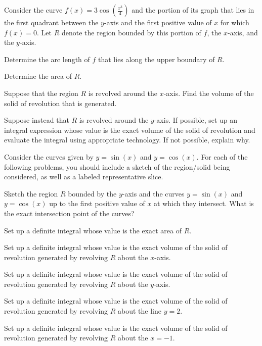 \begin{exercises} 

  \item Consider the curve $f(x) = 3 \cos(\frac{x^3}{4})$ and the portion of its graph that lies in the first quadrant between the $y$-axis and the first positive value of $x$ for which $f(x) = 0$.  Let  $R$ denote the region bounded by this portion of $f$, the $x$-axis, and the $y$-axis.  
   \ba
   		\item Determine the arc length of $f$ that lies along the upper boundary of $R$. 	
		\item Determine the area of $R$.
		\item Suppose that the region $R$ is revolved around the $x$-axis.  Find the volume of the solid of revolution that is generated.  
		\item Suppose instead that $R$ is revolved around the $y$-axis.  If possible, set up an integral expression whose value is the exact volume of the solid of revolution and evaluate the integral using appropriate technology.  If not possible, explain why. 
   \ea

\item Consider the curves given by $y = \sin(x)$ and $y = \cos(x)$.  For each of the following problems, you should include a sketch of the region/solid being considered, as well as a labeled representative slice.
	\ba
		\item Sketch the region $R$ bounded by the $y$-axis and the curves $y = \sin(x)$ and $y = \cos(x)$ up to the first positive value of $x$ at which they intersect. What is the exact intersection point of the curves?
		\item Set up a definite integral whose value is the exact area of $R$.
		\item Set up a definite integral whose value is the exact volume of the solid  of revolution generated by revolving $R$ about the $x$-axis.
		\item Set up a definite integral whose value is the exact volume of the solid  of revolution generated by revolving $R$ about the $y$-axis.
		\item Set up a definite integral whose value is the exact volume of the solid  of revolution generated by revolving $R$ about the line $y = 2$.
		\item Set up a definite integral whose value is the exact volume of the solid  of revolution generated by revolving $R$ about the $x = -1$.
	\ea



\end{exercises}
